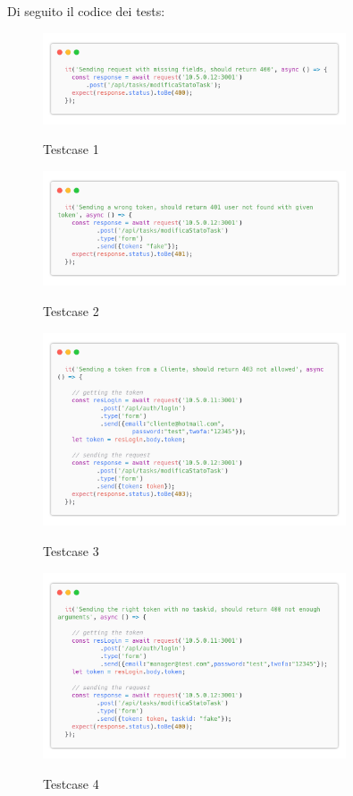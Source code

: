 \documentclass{report}
\begin{document}
Di seguito il codice dei tests:

\begin{figure}[H]
	\centering\includegraphics[width=0.8\textwidth]{images/code_modifica_stato_test1.png}

	Testcase 1
\end{figure}
\begin{figure}[H]
	\centering\includegraphics[width=0.8\textwidth]{images/code_modifica_stato_test2.png}

	Testcase 2
\end{figure}
\begin{figure}[H]
	\centering\includegraphics[width=0.8\textwidth]{images/code_modifica_stato_test3.png}

	Testcase 3
\end{figure}
\begin{figure}[H]
	\centering\includegraphics[width=0.8\textwidth]{images/code_modifica_stato_test4.png}

	Testcase 4
\end{figure}
\end{document}
